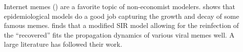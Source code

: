 Internet memes (\cite{dawkins1978selfish}) are a favorite topic of non-economist modelers.  shows that epidemiological models do a good job capturing the growth and decay of some famous memes. \cite{wang2011epidemiological} finds that a modified SIR model allowing for the reinfection of the ``recovered'' fits  the propagation dynamics of various viral memes well.   A large literature has followed their work. %




